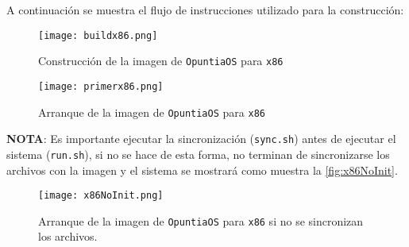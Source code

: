 	A continuación se muestra el flujo de instrucciones utilizado para la construcción:
	\begin{figure}[ht]
		\centering
		\texttt{[image: buildx86.png]}
		\caption{
			Construcción de la imagen de \texttt{OpuntiaOS} para \texttt{x86}
			\label{fig:buildx86}
		}
	\end{figure}
	\begin{figure}[ht]
		\centering
		\texttt{[image: primerx86.png]}
		\caption{
			Arranque de la imagen de \texttt{OpuntiaOS} para \texttt{x86}
			\label{fig:buildx86_res}
		}
	\end{figure}
	
	\textbf{NOTA}: Es importante ejecutar la sincronización (\texttt{sync.sh}) antes de 
	ejecutar el sistema (\texttt{run.sh}), si no se hace de esta forma, no terminan de sincronizarse los archivos con la imagen y el sistema se mostrará como muestra la \autoref{fig:x86NoInit}.
	\begin{figure}[ht]
		\centering
		\texttt{[image: x86NoInit.png]}
		\caption{
			Arranque de la imagen de \texttt{OpuntiaOS} para \texttt{x86} si no se sincronizan los archivos.
			\label{fig:x86NoInit}
		}
	\end{figure}


















